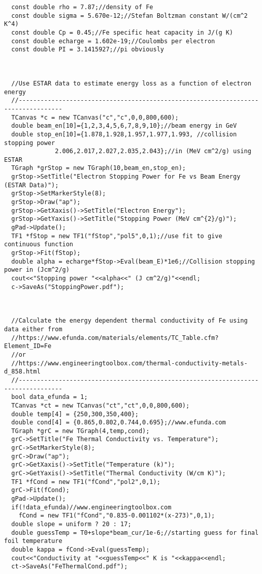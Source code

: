 \documentclass[12pt]{article}
\begin{document}
\begin{lstlisting}
  const double rho = 7.87;//density of Fe
  const double sigma = 5.670e-12;//Stefan Boltzman constant W/(cm^2 K^4)
  const double Cp = 0.45;//Fe specific heat capacity in J/(g K)
  const double echarge = 1.602e-19;//Coulombs per electron
  const double PI = 3.1415927;//pi obviously

  

  //Use ESTAR data to estimate energy loss as a function of electron energy
  //----------------------------------------------------------------------------------
  TCanvas *c = new TCanvas("c","c",0,0,800,600);
  double beam_en[10]={1,2,3,4,5,6,7,8,9,10};//beam energy in GeV
  double stop_en[10]={1.878,1.928,1.957,1.977,1.993, //collision stopping power 
		      2.006,2.017,2.027,2.035,2.043};//in (MeV cm^2/g) using ESTAR
  TGraph *grStop = new TGraph(10,beam_en,stop_en);
  grStop->SetTitle("Electron Stopping Power for Fe vs Beam Energy (ESTAR Data)");
  grStop->SetMarkerStyle(8);
  grStop->Draw("ap");
  grStop->GetXaxis()->SetTitle("Electron Energy");
  grStop->GetYaxis()->SetTitle("Stopping Power (MeV cm^{2}/g)");
  gPad->Update();
  TF1 *fStop = new TF1("fStop","pol5",0,1);//use fit to give continuous function
  grStop->Fit(fStop);  
  double alpha = echarge*fStop->Eval(beam_E)*1e6;//Collision stopping power in (Jcm^2/g)
  cout<<"Stopping power "<<alpha<<" (J cm^2/g)"<<endl;
  c->SaveAs("StoppingPower.pdf");

  

  //Calculate the energy dependent thermal conductivity of Fe using data either from
  //https://www.efunda.com/materials/elements/TC_Table.cfm?Element_ID=Fe
  //or
  //https://www.engineeringtoolbox.com/thermal-conductivity-metals-d_858.html
  //----------------------------------------------------------------------------------
  bool data_efunda = 1;
  TCanvas *ct = new TCanvas("ct","ct",0,0,800,600);
  double temp[4] = {250,300,350,400};
  double cond[4] = {0.865,0.802,0.744,0.695};//www.efunda.com
  TGraph *grC = new TGraph(4,temp,cond);
  grC->SetTitle("Fe Thermal Conductivity vs. Temperature");
  grC->SetMarkerStyle(8);
  grC->Draw("ap");
  grC->GetXaxis()->SetTitle("Temperature (k)");
  grC->GetYaxis()->SetTitle("Thermal Conductivity (W/cm K)");
  TF1 *fCond = new TF1("fCond","pol2",0,1);
  grC->Fit(fCond);
  gPad->Update();
  if(!data_efunda)//www.engineeringtoolbox.com
    fCond = new TF1("fCond","0.835-0.001102*(x-273)",0,1);
  double slope = uniform ? 20 : 17;
  double guessTemp = T0+slope*beam_cur/1e-6;//starting guess for final foil temperature
  double kappa = fCond->Eval(guessTemp);
  cout<<"Conductivity at "<<guessTemp<<" K is "<<kappa<<endl;
  ct->SaveAs("FeThermalCond.pdf");



\end{lstlisting}
\end{document}
